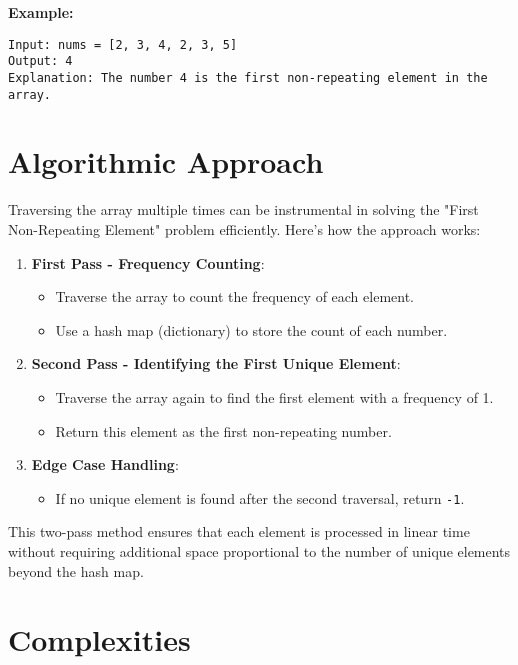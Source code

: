 \textbf{Example:}
\begin{verbatim}
Input: nums = [2, 3, 4, 2, 3, 5]
Output: 4
Explanation: The number 4 is the first non-repeating element in the array.
\end{verbatim}


\section*{Algorithmic Approach}

Traversing the array multiple times can be instrumental in solving the "First Non-Repeating Element" problem efficiently. Here's how the approach works:

\begin{enumerate}
    \item \textbf{First Pass - Frequency Counting}: 
    \begin{itemize}
        \item Traverse the array to count the frequency of each element.
        \item Use a hash map (dictionary) to store the count of each number.
    \end{itemize}
    
    \item \textbf{Second Pass - Identifying the First Unique Element}: 
    \begin{itemize}
        \item Traverse the array again to find the first element with a frequency of 1.
        \item Return this element as the first non-repeating number.
    \end{itemize}
    
    \item \textbf{Edge Case Handling}: 
    \begin{itemize}
        \item If no unique element is found after the second traversal, return \texttt{-1}.
    \end{itemize}
\end{enumerate}

This two-pass method ensures that each element is processed in linear time without requiring additional space proportional to the number of unique elements beyond the hash map.

\section*{Complexities}

